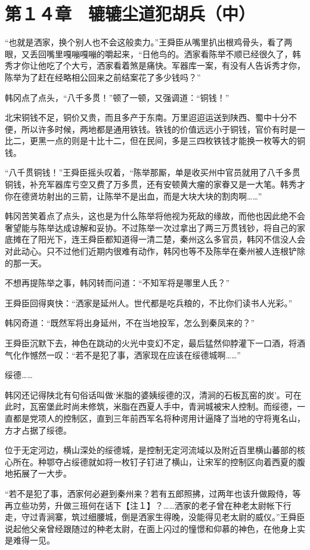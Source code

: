 \section{第１４章　辘辘尘道犯胡兵（中）}

“也就是洒家，换个别人也不会这般卖力。”王舜臣从嘴里扒出根鸡骨头，看了两眼，又丢回嘴里嘎嘣嘎嘣的嚼起来，“日他鸟的。洒家看陈举不顺已经很久了，韩秀才你让他吃了个大亏，洒家看着煞是痛快。军器库一案，有没有人告诉秀才你，陈举为了赶在经略相公回来之前结案花了多少钱吗？”

韩冈点了点头，“八千多贯！”顿了一顿，又强调道：“铜钱！”

北宋铜钱不足，铜价又贵，而且多产于东南。万里迢迢运送到陕西、蜀中十分不便，所以许多时候，两地都是通用铁钱。铁钱的价值远远小于铜钱，官价有时是一比二，更黑一点的则是十比十二，但在民间，多是三四枚铁钱才能换一枚等大的铜钱。

“八千贯铜钱！”王舜臣摇头叹着，“陈举那厮，单是收买州中官员就用了八千多贯铜钱，补充军器库亏空又费了万多贯，还有安顿黄大瘤的家眷又是一大笔。韩秀才你在德贤坊射出的三箭，让陈举不是出血，而是大块大块的割肉啊……”

韩冈苦笑着点了点头，这也是为什么陈举将他视为死敌的缘故，而他也因此绝不会奢望能与陈举达成谅解和妥协。不过陈举一次过拿出了两三万贯钱钞，将自己的家底摊在了阳光下，连王舜臣都知道得一清二楚，秦州这么多官员，韩冈不信没人会对此动心。只不过他们近期内很难有动作，韩冈也等不及陈举在秦州被人连根铲除的那一天。

不想再提陈举之事，韩冈转而问道：“不知军将是哪里人氏？”

王舜臣回得爽快：“洒家是延州人。世代都是吃兵粮的，不比你们读书人光彩。”

韩冈奇道：“既然军将出身延州，不在当地投军，怎么到秦凤来的？”

王舜臣沉默下去，神色在跳动的火光中变幻不定，最后猛然仰脖灌下一口酒，将酒气化作憾然一叹：“若不是犯了事，洒家现在应该在绥德城啊……”

绥德……

韩冈还记得陕北有句俗话叫做‘米脂的婆姨绥德的汉，清涧的石板瓦窑的炭’。可在此时，瓦窑堡此时尚未修筑，米脂在西夏人手中，青涧城被宋人控制。而绥德，一直都是党项人的控制区，直到三年前西军名将种谔用计逼降了当地的守将嵬名山，方才占据了绥德。

位于无定河边，横山深处的绥德城，是控制无定河流域以及附近百里横山蕃部的核心所在。种鄂夺占绥德就如将一枚钉子钉进了横山，让宋军的控制区向着西夏的腹地拓展了一大步。

“若不是犯了事，洒家何必避到秦州来？若有五郎照拂，过两年也该升做殿侍，等再立些功劳，升做三班何在话下【注１】？……洒家的老子曾在种老太尉帐下行走，守过青涧寨，筑过细腰城，倒是洒家生得晚，没能得见老太尉的威仪。”王舜臣说起他父亲曾经跟随过的种老太尉，在面上闪过的憧憬和仰慕的神色，在他身上实是难得一见。

